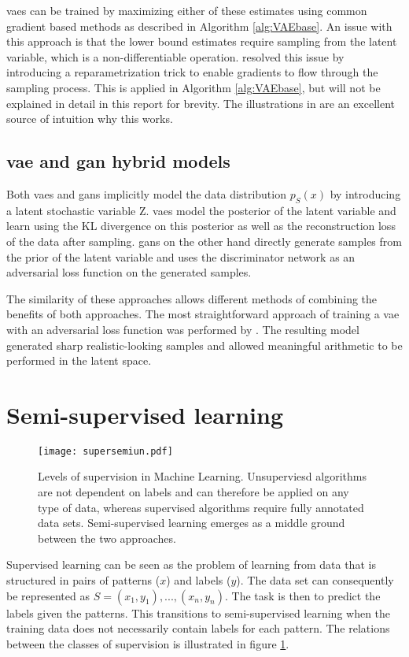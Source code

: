 \acrshort{vaes} can be trained by maximizing either of these estimates using common gradient based methods as described in Algorithm \ref{alg:VAEbase}. An issue with this approach is that the lower bound estimates require sampling from the latent variable, which is a non-differentiable operation. \textcite{kingma2013auto} resolved this issue by introducing a reparametrization trick to enable gradients to flow through the sampling process. This is applied in Algorithm \ref{alg:VAEbase}, but will not be explained in detail in this report for brevity. The illustrations in \parencite{doersch2016tutorial} are an excellent source of intuition why this works.

\subsection{\acrshort{vae} and \acrshort{gan} hybrid models}
Both \acrshort{vaes} and \acrshort{gans} implicitly model the data distribution $p_S(x)$ by introducing a latent stochastic variable Z. \acrshort{vaes} model the posterior of the latent variable and learn using the KL divergence on this posterior as well as the reconstruction loss of the data after sampling. \acrshort{gans} on the other hand directly generate samples from the prior of the latent variable and uses the discriminator network as an adversarial loss function on the generated samples. 

The similarity of these approaches allows different methods of combining the benefits of both approaches. The most straightforward approach of training a \acrshort{vae} with an adversarial loss function was performed by \textcite{LarsenSW15autoencodingbeyond}. The resulting model generated sharp realistic-looking samples and allowed meaningful arithmetic to be performed in the latent space.

\section{Semi-supervised learning}
\begin{figure}
    \centering
    \texttt{[image: supersemiun.pdf]}
    \caption{Levels of supervision in Machine Learning. Unsuperviesd algorithms are not dependent on labels and can therefore be applied on any type of data, whereas supervised algorithms require fully annotated data sets. Semi-supervised learning emerges as a middle ground between the two approaches.}
    \label{fig:supersemiun}
\end{figure}
Supervised learning can be seen as the problem of learning from data that is structured in pairs of patterns ($x$) and labels ($y$). The data set can consequently be represented as $S = {(x_1, y_1), ..., (x_n, y_n)}$. The task is then to predict the labels given the patterns. This transitions to semi-supervised learning when the training data does not necessarily contain labels for each pattern. The relations between the classes of supervision is illustrated in figure \ref{fig:supersemiun}. 

